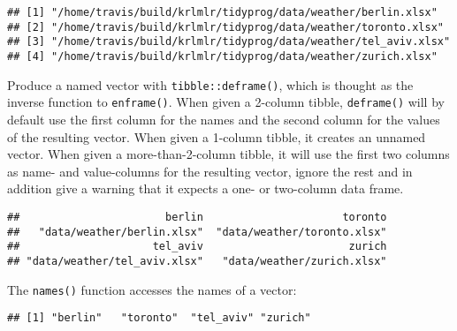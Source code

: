 \documentclass[]{book}
\newenvironment{Shaded}{\begin{snugshade}}{\end{snugshade}}
\newcommand{\KeywordTok}[1]{\textcolor[rgb]{0.13,0.29,0.53}{\textbf{#1}}}
\newcommand{\NormalTok}[1]{#1}
\newcommand{\OperatorTok}[1]{\textcolor[rgb]{0.81,0.36,0.00}{\textbf{#1}}}
\newcommand{\StringTok}[1]{\textcolor[rgb]{0.31,0.60,0.02}{#1}}
\begin{document}
\begin{verbatim}
## [1] "/home/travis/build/krlmlr/tidyprog/data/weather/berlin.xlsx"  
## [2] "/home/travis/build/krlmlr/tidyprog/data/weather/toronto.xlsx" 
## [3] "/home/travis/build/krlmlr/tidyprog/data/weather/tel_aviv.xlsx"
## [4] "/home/travis/build/krlmlr/tidyprog/data/weather/zurich.xlsx"
\end{verbatim}

Produce a named vector with \texttt{tibble::deframe()}, which is thought as the inverse function to \texttt{enframe()}.
When given a 2-column tibble, \texttt{deframe()} will by default use the first column for the names and the second column for the values of the resulting vector.
When given a 1-column tibble, it creates an unnamed vector.
When given a more-than-2-column tibble, it will use the first two columns as name- and value-columns for the resulting vector, ignore the rest and in addition give a warning that it expects a one- or two-column data frame.

\begin{Shaded}
\end{Shaded}

\begin{verbatim}
##                       berlin                      toronto 
##   "data/weather/berlin.xlsx"  "data/weather/toronto.xlsx" 
##                     tel_aviv                       zurich 
## "data/weather/tel_aviv.xlsx"   "data/weather/zurich.xlsx"
\end{verbatim}

The \texttt{names()} function accesses the names of a vector:

\begin{Shaded}
\end{Shaded}

\begin{verbatim}
## [1] "berlin"   "toronto"  "tel_aviv" "zurich"
\end{verbatim}
\end{document}
